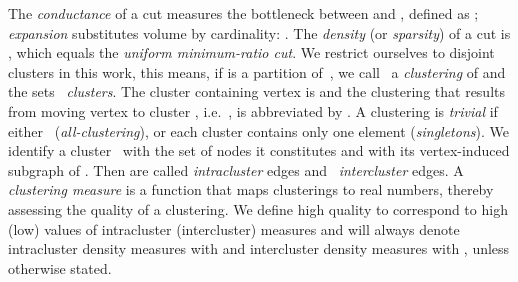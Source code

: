 \documentclass{llncs}
\begin{document}
The \emph{conductance} of a cut  measures the bottleneck between  and , defined as ;
\emph{expansion} substitutes volume by cardinality: .
The \emph{density} (or \emph{sparsity}) of a cut is , which equals the \emph{uniform minimum-ratio cut}.
We restrict ourselves to disjoint clusters in this work, this means, if  is a partition of~, we call~ a \emph{clustering} of  and the sets~ \emph{clusters}.
The cluster containing vertex  is  and the clustering that results from moving vertex  to cluster , i.e.~, is abbreviated by .
A clustering is \emph{trivial} if either~ (\emph{all-clustering}), or each cluster contains only one element (\emph{singletons}).
We identify a cluster~ with the set of nodes it constitutes and with its vertex-induced subgraph of .
Then  are called \emph{intracluster} edges and~ \emph{intercluster} edges.
A \emph{clustering measure} is a function that maps clusterings to real numbers, thereby assessing the quality of a clustering.
We define high quality to correspond to high (low) values of intracluster (intercluster) measures and will always denote intracluster density measures with  and intercluster density measures with , unless otherwise stated.
\end{document}
